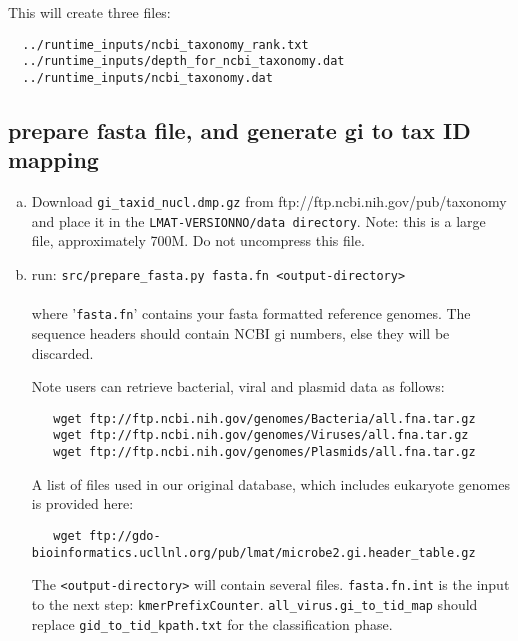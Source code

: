 \documentclass[11pt]{article}
\newcommand{\lmatver}{VERSIONNO}
\begin{document}
This will create three files:
\begin{verbatim}
  ../runtime_inputs/ncbi_taxonomy_rank.txt
  ../runtime_inputs/depth_for_ncbi_taxonomy.dat
  ../runtime_inputs/ncbi_taxonomy.dat
\end{verbatim}

\subsection{prepare fasta file, and generate gi to tax ID mapping}
 
\begin{enumerate}[a)]
\item
Download \texttt{gi\_taxid\_nucl.dmp.gz} from ftp://ftp.ncbi.nih.gov/pub/taxonomy
   and place it in the \texttt{LMAT-\lmatver/data directory}. Note: this is a large file,
   approximately 700M. Do not uncompress this file.
\item
run: \texttt{src/prepare\_fasta.py fasta.fn <output-directory>}\\
\\
   where '\texttt{fasta.fn}' contains your fasta formatted reference genomes. 
   The sequence headers should contain NCBI gi numbers, else they
   will be discarded.

   Note users can retrieve bacterial, viral and plasmid data as follows:
\begin{verbatim}
   wget ftp://ftp.ncbi.nih.gov/genomes/Bacteria/all.fna.tar.gz
   wget ftp://ftp.ncbi.nih.gov/genomes/Viruses/all.fna.tar.gz
   wget ftp://ftp.ncbi.nih.gov/genomes/Plasmids/all.fna.tar.gz
\end{verbatim}

   A list of files used in our original database, which includes eukaryote genomes is provided here:

\begin{verbatim}
   wget ftp://gdo-bioinformatics.ucllnl.org/pub/lmat/microbe2.gi.header_table.gz
\end{verbatim}
 

   The \texttt{<output-directory>} will contain several files. \texttt{fasta.fn.int}
   is the input to the next step: \texttt{kmerPrefixCounter}.
   \texttt{all\_virus.gi\_to\_tid\_map} should replace \texttt{gid\_to\_tid\_kpath.txt}
   for the classification phase.
\end{enumerate}
\end{document}
